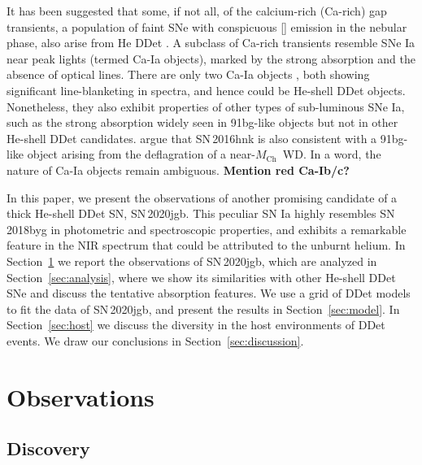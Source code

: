 \documentclass[twocolumn]{aastex631}
\newcommand{\sn}{SN\,2020jgb}
\newcommand{\Mch}{$M_\mathrm{Ch}$}
\begin{document}
It has been suggested that some, if not all, of the calcium-rich (Ca-rich) gap transients, a population of faint SNe with conspicuous [] emission in the nebular phase, also arise from He DDet \citep{Dessart_2015,de_Ca_rich_2020,polin_nebular_2021}. A subclass of Ca-rich transients resemble SNe Ia near peak lights (termed Ca-Ia objects), marked by the strong  absorption and the absence of optical  lines. There are only two Ca-Ia objects \citep[SN\,2016hnk and SN\,2019ofm;][]{de_Ca_rich_2020}, both showing significant line-blanketing in spectra, and hence could be He-shell DDet objects. Nonetheless, they also exhibit properties of other types of sub-luminous SNe Ia, such as the strong  absorption widely seen in 91bg-like objects \citep{Filippenko_91bg_1992} but not in other He-shell DDet candidates. \citet{galbany_16hnk_2019} argue that SN\,2016hnk is also consistent with a 91bg-like object arising from the deflagration of a near-\Mch\ WD. In a word, the nature of Ca-Ia objects remain ambiguous. \textbf{Mention red Ca-Ib/c?}


In this paper, we present the observations of another promising candidate of a thick He-shell DDet SN, \sn. This peculiar SN Ia highly resembles SN\,2018byg in photometric and spectroscopic properties, and exhibits a remarkable feature in the NIR spectrum that could be attributed to the unburnt helium. In Section~\ref{sec:obs} we report the observations of \sn, which are analyzed in Section~\ref{sec:analysis}, where we show its similarities with other He-shell DDet SNe and discuss the tentative  absorption features. We use a grid of DDet models to fit the data of \sn, and present the results in Section~\ref{sec:model}. In Section~\ref{sec:host} we discuss the diversity in the host environments of DDet events. We draw our conclusions in Section~\ref{sec:discussion}.

\section{Observations} \label{sec:obs}
\subsection{Discovery}
\end{document}
